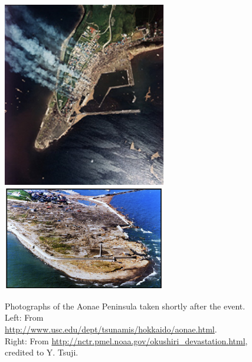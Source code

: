 \begin{figure}[ht]
\hfil\includegraphics[width=2.8in]{bp9/AonaePhoto.jpg}\hfil
\hfil\includegraphics[width=2.8in]{bp9/AonaePhoto2.png}\hfil


\caption{\label{bp9photos}
Photographs of the Aonae Peninsula taken shortly after the event. \\
Left: From \url{http://www.usc.edu/dept/tsunamis/hokkaido/aonae.html}. \\
Right: From \url{http://nctr.pmel.noaa.gov/okushiri_devastation.html}, credited to Y. Tsuji.
  }
\end{figure}

